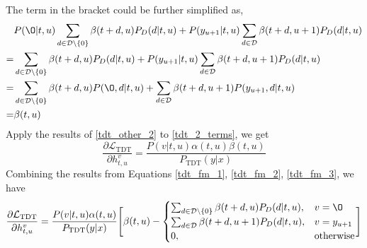 \documentclass{article}
\begin{document}
The term in the bracket could be further simplified as,
\begin{equation}\label{tdt_other_2}
\begin{aligned}
&  P(\O|t, u) \sum_{d \in \mathcal{D} \setminus \{0\}} {\beta(t + d,u) P_D(d|t, u)} + P(y_{u+1}|t, u)  \sum_{d \in \mathcal{D}}                 {\beta(t + d,u+1)P_D(d|t,u)}   \\
= &  \sum_{d \in \mathcal{D} \setminus \{0\}} {\beta(t + d,u) P_D(d|t, u)} + P(y_{u+1}|t, u) \sum_{d \in \mathcal{D}}                 {\beta(t + d,u+1)P_D(d|t,u)}  \\
= &  \sum_{d \in \mathcal{D} \setminus \{0\}} {\beta(t + d,u) P(\O, d|t, u)} + \sum_{d \in \mathcal{D}}{\beta(t + d,u+1)P(y_{u+1}, d|t,u)} \\
= & \beta(t, u) 
 \end{aligned}
\end{equation}
Apply the results of \ref{tdt_other_2} to \ref{tdt_2_terms}, we get
\begin{equation}\label{tdt_fm_3}
\frac{\partial{\mathcal{L}_\text{TDT}}}{\partial{h_{t, u}^{v}}} =    \frac{P(v|t, u) \alpha(t, u) \beta(t, u)}{P_\text{TDT}(y|x)} 
\end{equation}
Combining the results from Equations \ref{tdt_fm_1}, \ref{tdt_fm_2}, \ref{tdt_fm_3}, we have
\begin{equation}
\frac{\partial{\mathcal{L}_\text{TDT}}}{\partial{h_{t, u}^{v}}} =    \frac{P(v|t, u) \alpha(t, u)}{P_\text{TDT}(y|x)}    \Biggl[ \beta(t, u) - \begin{cases}
\sum_{d \in \mathcal{D} \setminus \{0\}} {\beta(t + d,u) P_D(d|t, u)}, & v = \O \\
\sum_{d \in \mathcal{D} } {\beta(t + d,u + 1) P_D(d|t, u)},  & v = y_{u+1} \\
0, & \text{otherwise}
\end{cases}
\Biggr] 
\end{equation}
\end{document}
